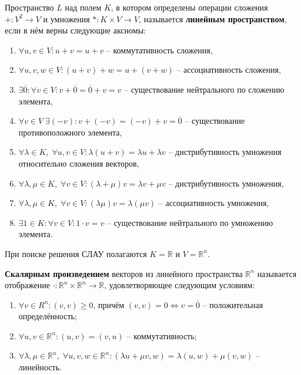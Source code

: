 \documentclass{article}
\begin{document}
\begin{define}
	Пространство $L$ над полем $K$, в котором определены операции сложения
	$+: V^2\rightarrow V$ и умножения $*: K\times V\rightarrow V$,
	называется \textbf{линейным пространством}, если в нём верны следующие
	аксиомы:

	\begin{enumerate}[nosep]
		\item $\forall u,v\in V: u+v=u+v$ -- коммутативность сложения,
		\item $\forall u,v,w\in V: (u+v)+w=u+(v+w)$ -- ассоциативность
			сложения,
		\item $\exists\overline{0}: \forall v\in V:
			v+\overline{0}=\overline{0}+v=v$ -- существование
			нейтрального по сложению элемента,
		\item $\forall v\in V\;\exists (-v): v+(-v)=(-v)+v=\overline{0}$
			-- существование противоположного элемента,
		\item $\forall\lambda\in K,\;\forall u,v\in V: \lambda(u+v)=
			\lambda u+\lambda v$ -- дистрибутивность умножения
			относительно сложения векторов,
		\item $\forall\lambda,\mu\in K,\;\forall v\in V:
			(\lambda+\mu)v=\lambda v+\mu v$ -- дистрибутивность
			умножения,
		\item $\forall\lambda,\mu\in K,\;\forall v\in V: (\lambda\mu)v=
			\lambda(\mu v)$ -- ассоциативность умножения,
		\item $\exists 1\in K: \forall v\in V: 1\cdot v=v$ --
			существование нейтрального по умножению элемента.
	\end{enumerate}
\end{define}

При поиске решения СЛАУ полагаются $K=\mathbb R$ и $V=\mathbb R^n$.

\begin{define}\label{eq:dot_production}
	\textbf{Скалярным произведением} векторов из линейного пространства
	$\mathbb R^n$ называется отображение $\cdot: \mathbb R^n\times
	\mathbb R^n\rightarrow \mathbb R$, удовлетворяющее следующим условиям:
	\begin{enumerate}[nosep]
		\item $\forall v\in R^n: (v,v)\ge 0$, причём $(v,v)=0
			\Leftrightarrow v=\overline{0}$ -- положительная
			определённость;
		\item $\forall u,v\in \mathbb R^n: (u,v)=(v,u)$ --
			коммутативность;
		\item $\forall \lambda,\mu \in\mathbb R^n,\;
			\forall u,v,w\in \mathbb R^n: (\lambda u+\mu v, w)=
			\lambda(u,w)+\mu(v,w)$ -- линейность.
	\end{enumerate}
\end{define}
\newpage
\end{document}
